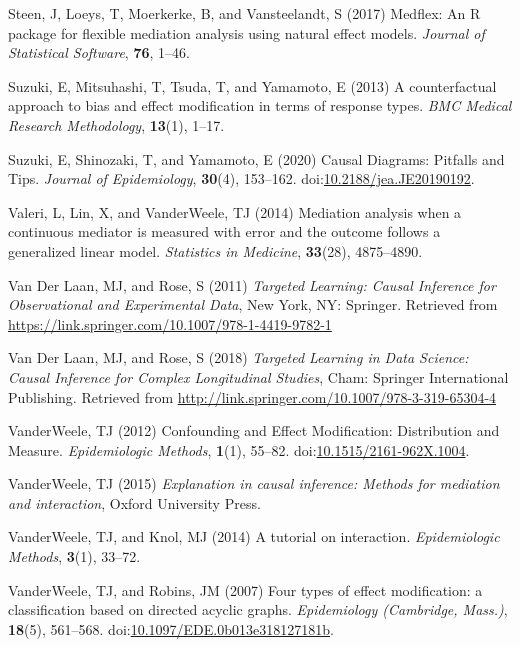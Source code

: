 \documentclass[
  single column]{article}
\newlength{\cslhangindent}
\newenvironment{CSLReferences}[2] %
 {\begin{list}{}{%
  \setlength{\itemindent}{0pt}
  \setlength{\leftmargin}{0pt}
  \setlength{\parsep}{0pt}
  \ifodd #1
   \setlength{\leftmargin}{\cslhangindent}
   \setlength{\itemindent}{-1\cslhangindent}
  \fi
  \setlength{\itemsep}{#2\baselineskip}}}
 {\end{list}}
\begin{document}
\begin{CSLReferences}{1}{0}
Steen, J, Loeys, T, Moerkerke, B, and Vansteelandt, S (2017) Medflex: An
{R} package for flexible mediation analysis using natural effect models.
\emph{Journal of Statistical Software}, \textbf{76}, 1--46.

Suzuki, E, Mitsuhashi, T, Tsuda, T, and Yamamoto, E (2013) A
counterfactual approach to bias and effect modification in terms of
response types. \emph{BMC Medical Research Methodology}, \textbf{13}(1),
1--17.

Suzuki, E, Shinozaki, T, and Yamamoto, E (2020) Causal Diagrams:
Pitfalls and Tips. \emph{Journal of Epidemiology}, \textbf{30}(4),
153--162.
doi:\href{https://doi.org/10.2188/jea.JE20190192}{10.2188/jea.JE20190192}.

Valeri, L, Lin, X, and VanderWeele, TJ (2014) Mediation analysis when a
continuous mediator is measured with error and the outcome follows a
generalized linear model. \emph{Statistics in Medicine},
\textbf{33}(28), 4875--4890.

Van Der Laan, MJ, and Rose, S (2011) \emph{Targeted Learning: Causal
Inference for Observational and Experimental Data}, New York, NY:
Springer. Retrieved from
\url{https://link.springer.com/10.1007/978-1-4419-9782-1}

Van Der Laan, MJ, and Rose, S (2018) \emph{Targeted Learning in Data
Science: Causal Inference for Complex Longitudinal Studies}, Cham:
Springer International Publishing. Retrieved from
\url{http://link.springer.com/10.1007/978-3-319-65304-4}

VanderWeele, TJ (2012) Confounding and Effect Modification: Distribution
and Measure. \emph{Epidemiologic Methods}, \textbf{1}(1), 55--82.
doi:\href{https://doi.org/10.1515/2161-962X.1004}{10.1515/2161-962X.1004}.

VanderWeele, TJ (2015) \emph{Explanation in causal inference: Methods
for mediation and interaction}, Oxford University Press.

VanderWeele, TJ, and Knol, MJ (2014) A tutorial on interaction.
\emph{Epidemiologic Methods}, \textbf{3}(1), 33--72.

VanderWeele, TJ, and Robins, JM (2007) Four types of effect
modification: a classification based on directed acyclic graphs.
\emph{Epidemiology (Cambridge, Mass.)}, \textbf{18}(5), 561--568.
doi:\href{https://doi.org/10.1097/EDE.0b013e318127181b}{10.1097/EDE.0b013e318127181b}.


\end{CSLReferences}
\end{document}
